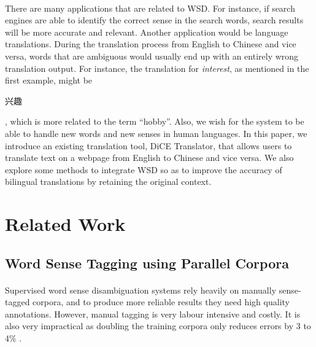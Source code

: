\documentclass[12 pt]{article}
\begin{document}
\paragraph{}
There are many applications that are related to WSD. For instance, if search engines are able to identify the correct sense in the search words, search results will be more accurate and relevant. Another application would be language translations. During the translation process from English to Chinese and vice versa, words that are ambiguous would usually end up with an entirely wrong translation output. For instance, the translation for \textit{interest}, as mentioned in the first example, might be \begin{CJK}{UTF8}{gbsn}兴趣\end{CJK}, which is more related to the term ``hobby''. Also, we wish for the system to be able to handle new words and new senses in human languages. In this paper, we introduce an existing translation tool, DiCE Translator, that allows users to translate text on a webpage from English to Chinese and vice versa. We also explore some methods to integrate WSD so as to improve the accuracy of bilingual translations by retaining the original context.

\section{Related Work}
\subsection{Word Sense Tagging using Parallel Corpora}
\label{parallel}
\paragraph{}
Supervised word sense disambiguation systems rely heavily on manually sense-tagged corpora, and to produce more reliable results they need high quality annotations. However, manual tagging is very labour intensive and costly. It is also very impractical as doubling the training corpora only reduces errors by 3 to 4\% \cite{yarowsky}.
\end{document}
